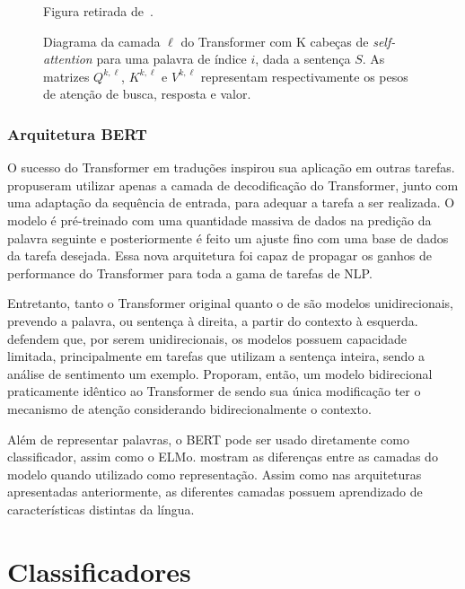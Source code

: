 \begin{figure}
\begin{center}
{\begin{center}
    \caption{Diagrama da camada $\ell$ do Transformer com K cabeças de
             \textit{self-attention} para uma palavra de índice $i$, dada a
             sentença $S$.
             As matrizes $Q^{k,\ell}$, $K^{k,\ell}$ e $V^{k,\ell}$ representam
             respectivamente os pesos de atenção de busca, resposta e valor.}
    \small Figura retirada de~\cite{joshi20}.
    \label{fig:transformer_layer}
    \end{center}
}
\end{center}
\end{figure}

\subsubsection{Arquitetura BERT}

O sucesso do Transformer em traduções inspirou sua aplicação em outras tarefas.
\citet{radford18} propuseram utilizar apenas a camada de decodificação do
Transformer, junto com uma adaptação da sequência de entrada, para adequar a
tarefa a ser realizada.
O modelo é pré-treinado com uma quantidade massiva de dados na predição da
palavra seguinte e posteriormente é feito um ajuste fino com uma base de dados
da tarefa desejada.
Essa nova arquitetura foi capaz de propagar os ganhos de performance do Transformer
para toda a gama de tarefas de NLP.

Entretanto, tanto o Transformer original quanto o de \citet{radford18} são
modelos unidirecionais, prevendo a palavra, ou sentença à direita, a partir do
contexto à esquerda.
\citet{devlin18} defendem que, por serem unidirecionais, os modelos possuem
capacidade limitada, principalmente em tarefas que utilizam a sentença
inteira, sendo a análise de sentimento um exemplo.
Proporam, então, um modelo bidirecional praticamente idêntico ao Transformer de
\citet{radford18} sendo sua única modificação ter o mecanismo de atenção
considerando bidirecionalmente o contexto.

Além de representar palavras, o BERT pode ser usado diretamente como
classificador, assim como o ELMo.
\citet{devlin18} mostram as diferenças entre as camadas do modelo quando
utilizado como representação.
Assim como nas arquiteturas apresentadas anteriormente, as diferentes camadas
possuem aprendizado de características distintas da língua.

\section{Classificadores}

